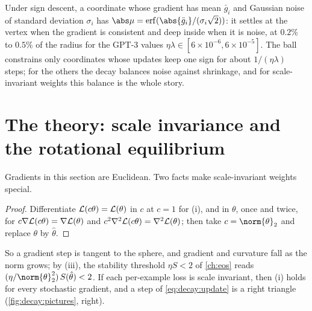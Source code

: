 \begin{refsection}
Under sign descent, a coordinate whose gradient has mean $\bar g_i$ and Gaussian noise of standard deviation $\sigma_i$ has $\abs\mu=\erf(\abs{\bar g_i}/(\sigma_i\sqrt2))$: it settles at the vertex when the gradient is consistent and deep inside when it is noise, at $0.2\%$ to $0.5\%$ of the radius for the GPT-3 values $\eta\lambda\in[6\times10^{-6},6\times10^{-5}]$. The ball constrains only coordinates whose updates keep one sign for about $1/(\eta\lambda)$ steps; for the others the decay balances noise against shrinkage, and for scale-invariant weights this balance is the whole story.

\section{The theory: scale invariance and the rotational equilibrium}\label{sec:decay:equilibrium}

Gradients in this section are Euclidean. Two facts make scale-invariant weights special.


\begin{proof}
Differentiate $\mathcal{L}(c\theta)=\mathcal{L}(\theta)$ in $c$ at $c=1$ for (i), and in $\theta$, once and twice, for $c\nabla\mathcal{L}(c\theta)=\nabla\mathcal{L}(\theta)$ and $c^2\nabla^2\mathcal{L}(c\theta)=\nabla^2\mathcal{L}(\theta)$; then take $c=\norm{\theta}_2$ and replace $\theta$ by $\hat\theta$.
\end{proof}

So a gradient step is tangent to the sphere, and gradient and curvature fall as the norm grows; by (iii), the stability threshold $\eta S<2$ of \cref{ch:eos} reads $(\eta/\norm{\theta}_2^2)\,S(\hat\theta)<2$. If each per-example loss is scale invariant, then (i) holds for every stochastic gradient, and a step of \eqref{eq:decay:update} is a right triangle (\cref{fig:decay:pictures}, right).


\end{refsection}
